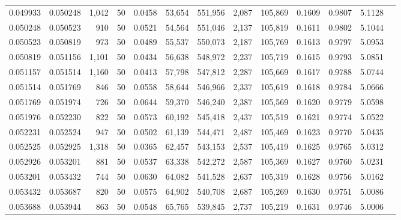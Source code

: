 \begin{tabular}{rrrrrrrrrrrrr}
0.049933 & 0.050248 & 1,042 &  50 &                                     0.0458 &  53,654 & 551,956 &   2,087 & 105,869 & 0.1609 & 0.9807 & 5.1128 \\
0.050248 & 0.050523 &   910 &  50 &                                     0.0521 &  54,564 & 551,046 &   2,137 & 105,819 & 0.1611 & 0.9802 & 5.1044 \\
0.050523 & 0.050819 &   973 &  50 &                                     0.0489 &  55,537 & 550,073 &   2,187 & 105,769 & 0.1613 & 0.9797 & 5.0953 \\
0.050819 & 0.051156 & 1,101 &  50 &                                     0.0434 &  56,638 & 548,972 &   2,237 & 105,719 & 0.1615 & 0.9793 & 5.0851 \\
0.051157 & 0.051514 & 1,160 &  50 &                                     0.0413 &  57,798 & 547,812 &   2,287 & 105,669 & 0.1617 & 0.9788 & 5.0744 \\
0.051514 & 0.051769 &   846 &  50 &                                     0.0558 &  58,644 & 546,966 &   2,337 & 105,619 & 0.1618 & 0.9784 & 5.0666 \\
0.051769 & 0.051974 &   726 &  50 &                                     0.0644 &  59,370 & 546,240 &   2,387 & 105,569 & 0.1620 & 0.9779 & 5.0598 \\
0.051976 & 0.052230 &   822 &  50 &                                     0.0573 &  60,192 & 545,418 &   2,437 & 105,519 & 0.1621 & 0.9774 & 5.0522 \\
0.052231 & 0.052524 &   947 &  50 &                                     0.0502 &  61,139 & 544,471 &   2,487 & 105,469 & 0.1623 & 0.9770 & 5.0435 \\
0.052525 & 0.052925 & 1,318 &  50 &                                     0.0365 &  62,457 & 543,153 &   2,537 & 105,419 & 0.1625 & 0.9765 & 5.0312 \\
0.052926 & 0.053201 &   881 &  50 &                                     0.0537 &  63,338 & 542,272 &   2,587 & 105,369 & 0.1627 & 0.9760 & 5.0231 \\
0.053201 & 0.053432 &   744 &  50 &                                     0.0630 &  64,082 & 541,528 &   2,637 & 105,319 & 0.1628 & 0.9756 & 5.0162 \\
0.053432 & 0.053687 &   820 &  50 &                                     0.0575 &  64,902 & 540,708 &   2,687 & 105,269 & 0.1630 & 0.9751 & 5.0086 \\
0.053688 & 0.053944 &   863 &  50 &                                     0.0548 &  65,765 & 539,845 &   2,737 & 105,219 & 0.1631 & 0.9746 & 5.0006 \\

\end{tabular}
